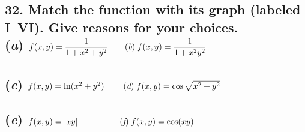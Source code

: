 \documentclass{article}
\begin{document}
\subsection*{32. Match the function with its graph (labeled I–VI). Give reasons for your choices. \\
    (\textit a) $f(x,y) = \displaystyle\frac 1 {1 + x^2 + y^2} \qquad (\textit b)\; f(x,y) = \frac 1 {1 + x^2 y^2}$ \\\\
    (\textit c) $f(x,y) = \ln (x^2 + y^2) \qquad \;(\textit d)\; f(x,y) = \cos \sqrt{x^2 + y^2}$ \\\\
    (\textit e) $f(x,y) = |xy| \qquad \qquad \quad (\textit f)\; f(x,y) = \cos (xy)$\\
}
\end{document}
